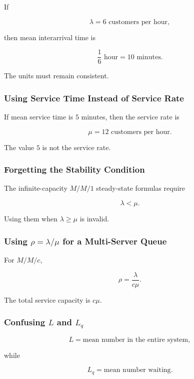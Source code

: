 If

\[
\lambda
=
6
\text{ customers per hour},
\]

then mean interarrival time is

\[
\boxed{
\frac16
\text{ hour}
=
10
\text{ minutes}.
}
\]

The units must remain consistent.

\subsubsection{Using Service Time Instead of Service Rate}

If mean service time is \(5\) minutes, then the service rate is

\[
\boxed{
\mu
=
12
\text{ customers per hour}.
}
\]

The value \(5\) is not the service rate.

\subsubsection{Forgetting the Stability Condition}

The infinite-capacity \(M/M/1\) steady-state formulas require

\[
\boxed{
\lambda<\mu.
}
\]

Using them when \(\lambda\geq\mu\) is invalid.

\subsubsection{Using \(\rho=\lambda/\mu\) for a Multi-Server Queue}

For \(M/M/c\),

\[
\boxed{
\rho
=
\frac{\lambda}{c\mu}.
}
\]

The total service capacity is \(c\mu\).

\subsubsection{Confusing \(L\) and \(L_q\)}

\[
L
=
\text{mean number in the entire system},
\]

while

\[
L_q
=
\text{mean number waiting}.
\]

